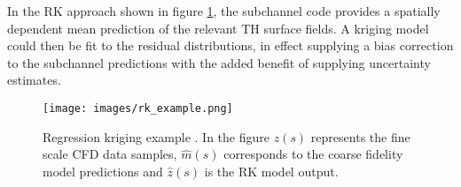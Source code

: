 %
%


In the RK approach shown in figure \ref{fit:rk}, the subchannel code provides a spatially dependent mean prediction of the relevant TH surface fields.  A kriging model could then be fit to the residual distributions, in effect supplying a bias correction to the subchannel predictions with the added benefit of supplying uncertainty estimates.   

\begin{figure}[hbtp]
	\centering
	\texttt{[image: images/rk\_example.png]}
	\caption[Regression kriging example.]{Regression kriging example \cite{Hengl07}.  In the figure $z(s)$ represents the fine scale CFD data samples, $\hat m(s)$ corresponds to the coarse fidelity model predictions and $\hat z(s)$ is the RK model output.}
	\label{fit:rk}
\end{figure}

